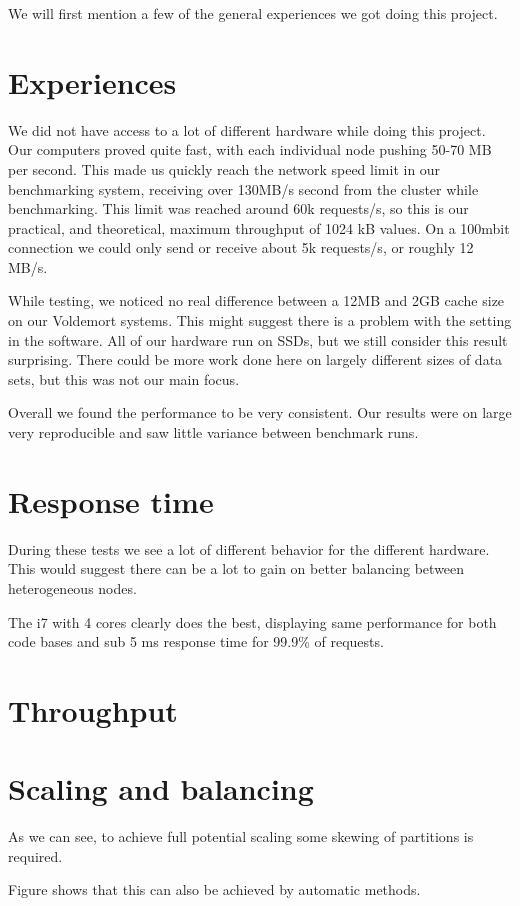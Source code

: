 
We will first mention a few of the general experiences we got doing this project.

\section{Experiences}
We did not have access to a lot of different hardware while doing this project. Our computers proved quite fast, with each individual node pushing 50-70 MB per second. This made us quickly reach the network speed limit in our benchmarking system, receiving over 130MB/s second from the cluster while benchmarking. This limit was reached around 60k requests/s, so this is our practical, and theoretical, maximum throughput of 1024 kB values. On a 100mbit connection we could only send or receive about 5k requests/s, or roughly 12 MB/s. 

While testing, we noticed no real difference between a 12MB and 2GB cache size on our Voldemort systems. This might suggest there is a problem with the setting in the software. All of our hardware run on SSDs, but we still consider this result surprising. There could be more work done here on largely different sizes of data sets, but this was not our main focus.

Overall we found the performance to be very consistent. Our results were on large very reproducible and saw little variance between benchmark runs.

\section{Response time}
During these tests we see a lot of different behavior for the different hardware. This would suggest there can be a lot to gain on better balancing between heterogeneous nodes.


The i7 with 4 cores clearly does the best, displaying same performance for both code bases and sub 5 ms response time for 99.9\% of requests.

\section{Throughput}

\section{Scaling and balancing}
As we can see, to achieve full potential scaling some skewing of partitions is required.

Figure shows that this can also be achieved by automatic methods.

